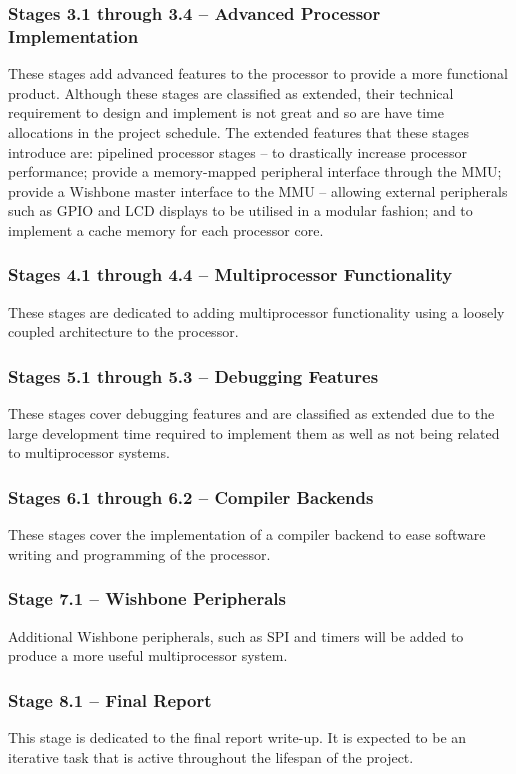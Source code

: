\documentclass[11pt,a4paper]{report}
\begin{document}
{\subsubsection{Stages 3.1 through 3.4 -- Advanced Processor Implementation}
These stages add advanced features to the processor to provide a more functional product. Although these stages are classified as extended, their technical requirement to design and implement is not great and so are have time allocations in the project schedule. The extended features that these stages introduce are: pipelined processor stages -- to drastically increase processor performance; provide a memory-mapped peripheral interface through the MMU; provide a Wishbone master interface to the MMU -- allowing external peripherals such as GPIO and LCD displays to be utilised in a modular fashion; and to implement a cache memory for each processor core.

\subsubsection{Stages 4.1 through 4.4 -- Multiprocessor Functionality}
These stages are dedicated to adding multiprocessor functionality using a loosely coupled architecture to the processor.

\subsubsection{Stages 5.1 through 5.3 -- Debugging Features}
These stages cover debugging features and are classified as extended due to the large development time required to implement them as well as not being related to multiprocessor systems.

\subsubsection{Stages 6.1 through 6.2 -- Compiler Backends}
These stages cover the implementation of a compiler backend to ease software writing and programming of the processor.

\subsubsection{Stage 7.1 -- Wishbone Peripherals}
Additional Wishbone peripherals, such as SPI and timers will be added to produce a more useful multiprocessor system.

\subsubsection{Stage 8.1 -- Final Report}
This stage is dedicated to the final report write-up. It is expected to be an iterative task that is active throughout the lifespan of the project.

}
\end{document}
